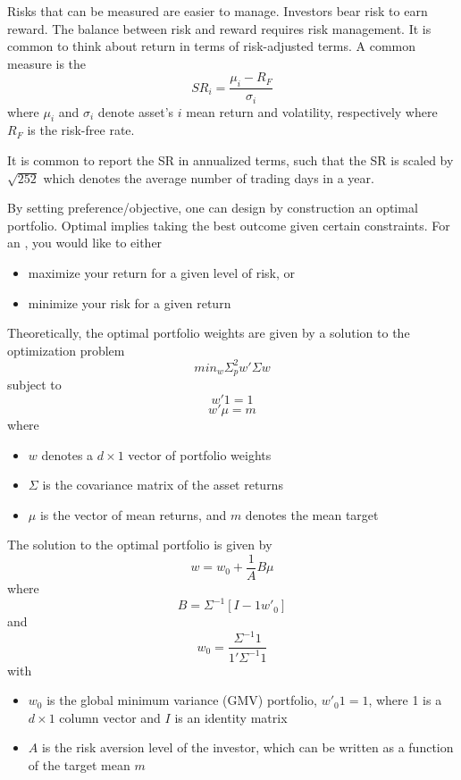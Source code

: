\documentclass{article}
\begin{document}
Risks that can be measured are easier to manage. Investors bear risk to earn reward. The balance between risk and reward requires risk management. It is common to think about return in terms of risk-adjusted terms. A common measure is the  $$SR_i = \frac{\mu_i - R_F}{\sigma_i}$$ where $\mu_i$ and $\sigma_i$ denote asset's $i$ mean return and volatility, respectively where $R_F$ is the risk-free rate. \\ 

\begin{remark}
  It is common to report the SR in annualized terms, such that the SR is scaled by $\sqrt{252}$ which denotes the average number of trading days in a year. 
\end{remark}

By setting preference/objective, one can design by construction an optimal portfolio. Optimal implies taking the best outcome given certain constraints. For an , you would like to either 
\begin{itemize}
  \item maximize your return for a given level of risk, or 
  \item minimize your risk for a given return
\end{itemize}
Theoretically, the optimal portfolio weights are given by a solution to the optimization problem $$min_w \Sigma^{2}_{p}w' \Sigma w$$ subject to $$w'1 = 1$$ $$w' \mu = m$$ where \begin{itemize}
  \item $w$ denotes a $d \times 1$ vector of portfolio weights 
  \item $\Sigma$ is the covariance matrix of the asset returns 
  \item $\mu$ is the vector of mean returns, and $m$ denotes the mean target
\end{itemize}

The solution to the optimal portfolio is given by $$w = w_0 + \frac{1}{A}B \mu$$ where $$B = \Sigma^{-1}[I -1w'_0]$$ and $$w_0 = \frac{\Sigma^{-1}1}{1'\Sigma^{-1}1}$$ with \begin{itemize}
  \item $w_0$ is the global minimum variance (GMV) portfolio, $w'_0 1 = 1$, where 1 is a $d \times 1$ column vector and $I$ is an identity matrix 
  \item $A$ is the risk aversion level of the investor, which can be written as a function of the target mean $m$
\end{itemize}
\end{document}

